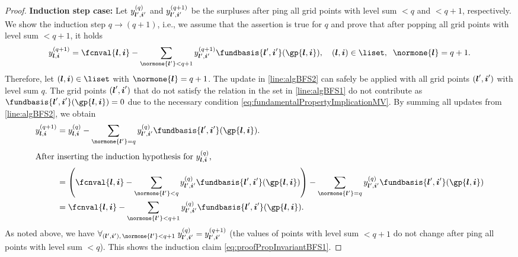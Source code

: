 \begin{proof}
  \noindent
  \textbf{Induction step case:}
  Let $\linout[(q)]{\*l',\*i'}$ and
  $\linout[(q+1)]{\*l',\*i'}$
  be the surpluses after \pop{}ping all
  grid points with level sum $< q$ and $< q + 1$, respectively.
  We show the induction step $q \to (q + 1)$, i.e.,
  we assume that the assertion is true for $q$
  and prove that after popping all grid points with level sum $< q + 1$,
  it holds
  \begin{equation}
    \label{eq:proofPropInvariantBFS1}
    \linout[(q+1)]{\*l,\*i}
    = \fcnval{\*l,\*i} -
    \sum_{\normone{\*l'} < q+1} \linout[(q+1)]{\*l',\*i'}
    \fundbasis{\*l',\*i'}(\gp{\*l,\*i}),\quad
    (\*l, \*i) \in \liset,\;\;
    \normone{\*l} = q+1.
  \end{equation}
  Therefore, let $(\*l, \*i) \in \liset$ with $\normone{\*l} = q+1$.
  The update in \cref{line:algBFS2} can safely be applied
  with all grid points $({\boldsymbol{l}}', {\boldsymbol{i}}')$ with level sum $q$.
  The grid points $({\boldsymbol{l}}', {\boldsymbol{i}}')$ that do not satisfy the relation in the set in
  \cref{line:algBFS1} do not contribute as
  $\fundbasis{\*l',\*i'}(\gp{\*l,\*i}) = 0$
  due to the necessary condition \eqref{eq:fundamentalPropertyImplicationMV}.
  By summing all updates from \cref{line:algBFS2}, we obtain
  \begin{subequations}
    \begin{align}
      \linout[(q+1)]{\*l,\*i}
      &= \linout[(q)]{\*l,\*i} -
      \sum_{\normone{\*l'} = q} \linout[(q)]{\*l',\*i'}
      \fundbasis{\*l',\*i'}(\gp{\*l,\*i}).\\
      \intertext{%
        After inserting the induction hypothesis
        for $\linout[(q)]{\*l,\*i}$,%
      }
      &= \left(\fcnval{\*l,\*i} -
      \sum_{\normone{\*l'} < q} \linout[(q)]{\*l',\*i'}
      \fundbasis{\*l',\*i'}(\gp{\*l,\*i})\right) -
      \sum_{\normone{\*l'} = q} \linout[(q)]{\*l',\*i'}
      \fundbasis{\*l',\*i'}(\gp{\*l,\*i})\\
      &= \fcnval{\*l,\*i} -
      \sum_{\normone{\*l'} < q + 1} \linout[(q)]{\*l',\*i'}
      \fundbasis{\*l',\*i'}(\gp{\*l,\*i}).
    \end{align}
  \end{subequations}
  As noted above, we have
  $\fa{(\*l', \*i'),\, \normone{\*l'} < q + 1}{
    \linout[(q)]{\*l',\*i'} = \linout[(q+1)]{\*l',\*i'}
  }$
  (the values of points with level sum $< q + 1$
  do not change after \pop{}ping all points with level sum $< q$).
  This shows the induction claim \eqref{eq:proofPropInvariantBFS1}.
\end{proof}



